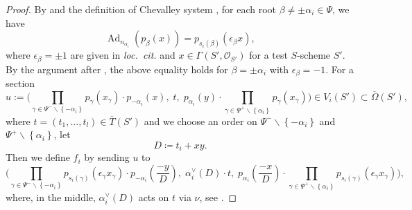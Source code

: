 \documentclass[11pt, reqno]{amsart}
\theoremstyle{plain}
\theoremstyle{definition}
\DeclareMathOperator{\Ad}{\mathrm{Ad}}			%
\begin{document}
\begin{proof}
    By \cite[exposé~XXIII, lemme~3.1.1 (iii)]{SGA3III} and the definition of Chevalley system \cite[exposé~XXIII, définition~6.1]{SGA3III}, for each root $\beta\neq \pm \alpha_i\in \Psi$, we have 
    $$\Ad_{n_{\alpha_i}}(p_\beta(x))=p_{s_i(\beta)}(\epsilon_\beta x),$$ 
    where $\epsilon_\beta=\pm 1$ are given in \emph{loc.~cit.} and $x\in \Gamma(S', \mathcal{O}_{S'})$ for a test $S$-scheme $S'$. By the argument after \cite[exposé~XXIII, définition~6.1]{SGA3III}, the above equality holds for $\beta=\pm \alpha_i$ with $\epsilon_\beta=-1$. For a section
    $$u:=\bigg(\prod_{\gamma\in \Psi^-\backslash \left\{-\alpha_i\right\}}p_\gamma(x_\gamma)\cdot p_{-\alpha_i}(x),\;t,\; p_{\alpha_i}(y)\cdot \prod_{\gamma\in \Psi^+ \backslash\left\{\alpha_i\right\}}p_\gamma(x_\gamma)\bigg)\in  V_i(S') \subset\overline{\Omega}(S'),$$
    where $t=(t_1,...,t_l)\in \overline{T}(S')$ and we choose an order on $\Psi^- \backslash\left\{-\alpha_i\right\}$ and $\Psi^+ \backslash\left\{\alpha_i\right\}$, let 
    $$D\coloneq t_i+xy.$$
    Then we define $f_i$ by sending $u$ to 
    \begin{equation}\label{defoff_i}
        \bigg(\prod_{\gamma\in \Psi^- \backslash\left\{-\alpha_i\right\}}p_{s_i(\gamma)}(\epsilon_\gamma x_\gamma)\cdot p_{-\alpha_i}\left(\frac{-y}{D}\right),\; \alpha_i^\vee(D)\cdot t
    ,\; p_{\alpha_i}\left(\frac{-x}{D}\right)\cdot \prod_{\gamma\in \Psi^+ \backslash\left\{\alpha_i\right\}}p_{s_i(\gamma)}(\epsilon_\gamma x_\gamma)\bigg),
    \end{equation}
    where, in the middle, $\alpha_i^\vee(D)$ acts on $t$ via $\nu$, see . 
    

\end{proof}
\end{document}
